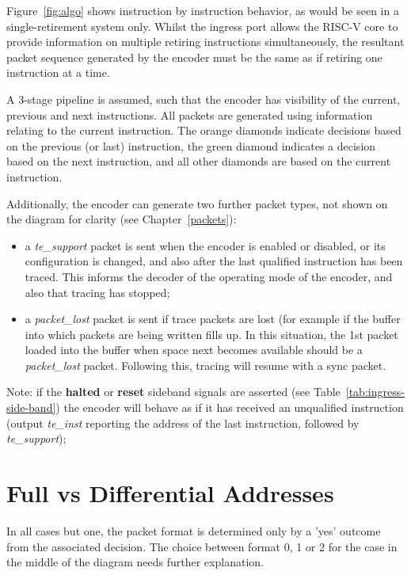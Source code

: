 Figure~\ref{fig:algo} shows instruction by instruction behavior, as would be
seen in a single-retirement system only.  Whilst the ingress port allows the RISC-V core to
provide information on multiple retiring instructions simultaneously, the resultant packet
sequence generated by the encoder must be the same as if retiring one instruction at a time.

A 3-stage pipeline is assumed, such that the encoder has 
visibility of the current, previous and next instructions.  All packets are generated using 
information relating to the current instruction.  The orange diamonds indicate decisions 
based on the previous (or last) instruction, the green diamond indicates a decision based on the
next instruction, and all other diamonds are based on the current instruction.

Additionally, the encoder can generate two further packet types, not shown on the diagram for 
clarity (see Chapter~\ref{packets}):

\begin{itemize}
  \item a \textit{te\_support} packet is sent when the encoder is enabled or disabled, or its
    configuration is changed, and also after the last qualified instruction has been traced.
    This informs the decoder of the operating mode of the encoder, and also that tracing has
    stopped;
  \item a \textit{packet\_lost} packet is sent if trace packets are lost (for example if the 
    buffer into which packets are being written fills up.  In this situation, the 1st packet 
    loaded into the buffer when space next becomes available should be a \textit{packet\_lost} 
    packet.  Following this, tracing will resume with a sync packet.
\end{itemize}

Note: if the \textbf{halted} or \textbf{reset} sideband signals are asserted (see Table~\ref{tab:ingress-side-band})
the encoder will behave as if it has received an unqualified instruction (output \textit{te\_inst}
reporting the address of the last instruction, followed by \textit{te\_support});

\section{Full vs Differential Addresses} \label{addresses}
In all cases but one, the packet format is determined only by a 'yes' outcome from the 
associated decision.  The choice between format 0, 1 or 2 for the case in the middle of the 
diagram needs further explanation.  

